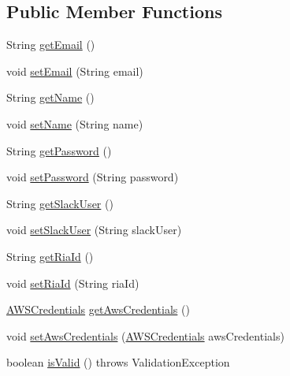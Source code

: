 \subsection*{Public Member Functions}
\begin{DoxyCompactItemize}
\item 
String \hyperlink{classedu_1_1sjsu_1_1amigo_1_1user_1_1db_1_1model_1_1_user_a74eb02cac8fbc341277a2966ae3b0d23}{get\+Email} ()
\item 
void \hyperlink{classedu_1_1sjsu_1_1amigo_1_1user_1_1db_1_1model_1_1_user_aff73e972167c6af4dddae59904cad95c}{set\+Email} (String email)
\item 
String \hyperlink{classedu_1_1sjsu_1_1amigo_1_1user_1_1db_1_1model_1_1_user_a178954b4a92a4398ce3a414af8089afd}{get\+Name} ()
\item 
void \hyperlink{classedu_1_1sjsu_1_1amigo_1_1user_1_1db_1_1model_1_1_user_a6a2bd81b91feaa24dfaab987e656fb13}{set\+Name} (String name)
\item 
String \hyperlink{classedu_1_1sjsu_1_1amigo_1_1user_1_1db_1_1model_1_1_user_ad7c3d865f9133ad5a8f30a66f95fde9b}{get\+Password} ()
\item 
void \hyperlink{classedu_1_1sjsu_1_1amigo_1_1user_1_1db_1_1model_1_1_user_af234773f7d87fe4a0c723bf020955a78}{set\+Password} (String password)
\item 
String \hyperlink{classedu_1_1sjsu_1_1amigo_1_1user_1_1db_1_1model_1_1_user_a44250804365b2199e01744653c702dc9}{get\+Slack\+User} ()
\item 
void \hyperlink{classedu_1_1sjsu_1_1amigo_1_1user_1_1db_1_1model_1_1_user_a0f0fc190611371447844c69b663622eb}{set\+Slack\+User} (String slack\+User)
\item 
String \hyperlink{classedu_1_1sjsu_1_1amigo_1_1user_1_1db_1_1model_1_1_user_aed0a6b0406d357404a3181444f682316}{get\+Ria\+Id} ()
\item 
void \hyperlink{classedu_1_1sjsu_1_1amigo_1_1user_1_1db_1_1model_1_1_user_aedaca262237c00f6e70af4bbe9d4a42f}{set\+Ria\+Id} (String ria\+Id)
\item 
\hyperlink{classedu_1_1sjsu_1_1amigo_1_1user_1_1db_1_1model_1_1_a_w_s_credentials}{A\+W\+S\+Credentials} \hyperlink{classedu_1_1sjsu_1_1amigo_1_1user_1_1db_1_1model_1_1_user_a9e6e9b6ff2cd51d29c3b189a34b37ed8}{get\+Aws\+Credentials} ()
\item 
void \hyperlink{classedu_1_1sjsu_1_1amigo_1_1user_1_1db_1_1model_1_1_user_a7dfe7c2b51f1ae7ea8b5749ee39acbc7}{set\+Aws\+Credentials} (\hyperlink{classedu_1_1sjsu_1_1amigo_1_1user_1_1db_1_1model_1_1_a_w_s_credentials}{A\+W\+S\+Credentials} aws\+Credentials)
\item 
boolean \hyperlink{classedu_1_1sjsu_1_1amigo_1_1user_1_1db_1_1model_1_1_user_a27600dc84a08bed3d7d78edb70654d46}{is\+Valid} ()  throws Validation\+Exception 
\end{DoxyCompactItemize}
